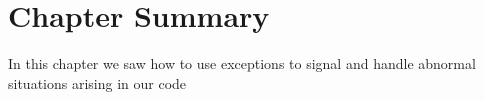 \documentclass[a4paper,10pt,twoside]{book}
\begin{document}






\section{Chapter Summary}

In this chapter we saw how to use exceptions to signal and handle abnormal situations arising in our code
\end{document}
